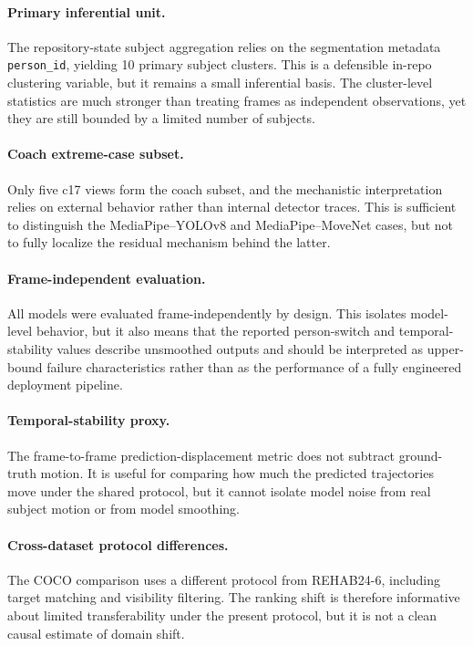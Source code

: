 \paragraph{Primary inferential unit.}
The repository-state subject aggregation relies on the segmentation metadata \texttt{person\_id}, yielding 10 primary subject clusters. This is a defensible in-repo clustering variable, but it remains a small inferential basis. The cluster-level statistics are much stronger than treating frames as independent observations, yet they are still bounded by a limited number of subjects.

\paragraph{Coach extreme-case subset.}
Only five c17 views form the coach subset, and the mechanistic interpretation relies on external behavior rather than internal detector traces. This is sufficient to distinguish the MediaPipe--YOLOv8 and MediaPipe--MoveNet cases, but not to fully localize the residual mechanism behind the latter.

\paragraph{Frame-independent evaluation.}
All models were evaluated frame-independently by design. This isolates model-level behavior, but it also means that the reported person-switch and temporal-stability values describe unsmoothed outputs and should be interpreted as upper-bound failure characteristics rather than as the performance of a fully engineered deployment pipeline.

\paragraph{Temporal-stability proxy.}
The frame-to-frame prediction-displacement metric does not subtract ground-truth motion. It is useful for comparing how much the predicted trajectories move under the shared protocol, but it cannot isolate model noise from real subject motion or from model smoothing.

\paragraph{Cross-dataset protocol differences.}
The COCO comparison uses a different protocol from REHAB24-6, including target matching and visibility filtering. The ranking shift is therefore informative about limited transferability under the present protocol, but it is not a clean causal estimate of domain shift.


